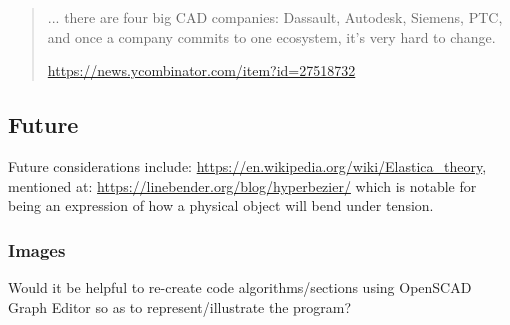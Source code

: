 \documentclass{ltxdoc}
\begin{document}
\begin{quotation}
\noindent ... there are four big CAD companies: Dassault, Autodesk, Siemens, PTC, and once a company commits to one ecosystem, it's very hard to change. 

\noindent \url{https://news.ycombinator.com/item?id=27518732}
\end{quotation}



\subsection{Future}

Future considerations include: \url{https://en.wikipedia.org/wiki/Elastica_theory}, mentioned at: \url{https://linebender.org/blog/hyperbezier/} which is notable for being an expression of how a physical object will bend under tension.

\subsubsection{Images}

Would it be helpful to re-create code algorithms/sections using OpenSCAD Graph Editor so as to represent/illustrate the program?

%

%
%
 
\end{document}
